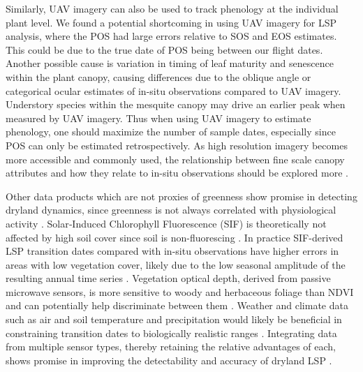 \documentclass{article}
\begin{document}
Similarly, UAV imagery can also be used to track phenology at the individual plant level. We found a potential shortcoming in using UAV imagery for LSP analysis, where the POS had large errors relative to SOS and EOS estimates. This could be due to the true date of POS being between our flight dates. Another possible cause is variation in timing of leaf maturity and senescence within the plant canopy, causing differences due to the oblique angle or categorical ocular estimates of in-situ observations compared to UAV imagery. Understory species within the mesquite canopy may drive an earlier peak when measured by UAV imagery. Thus when using UAV imagery to estimate phenology, one should maximize the number of sample dates, especially since POS can only be estimated retrospectively. As high resolution imagery becomes more accessible and commonly used, the relationship between fine scale canopy attributes and how they relate to in-situ observations should be explored more \cite{klosterman2018, cheng-vrieling2020}. 

Other data products which are not proxies of greenness show promise in detecting dryland dynamics, since greenness is not always correlated with physiological activity \cite{jeong-schimel2017}. Solar‐Induced Chlorophyll Fluorescence (SIF) is theoretically not affected by high soil cover since soil is non-fluorescing \cite{frankenberg2014, smith2018}. In practice SIF-derived LSP transition dates compared with in-situ observations have higher errors in areas with low vegetation cover, likely due to the low seasonal amplitude of the resulting annual time series \cite{wang-beringer2019}. Vegetation optical depth, derived from passive microwave sensors, is more sensitive to woody and herbaceous foliage than NDVI and can potentially help discriminate between them \cite{andela2013, tian2016}. Weather and climate data such as air and soil temperature and precipitation would likely be beneficial in constraining transition dates to biologically realistic ranges \cite{hudson2011, liu-liu2014, norris2020}. Integrating data from multiple sensor types, thereby retaining the relative advantages of each, shows promise in improving the detectability and accuracy of dryland LSP \cite{andela2013, tian2016, wang-xiao2019, dannenberg2020}.
\end{document}
